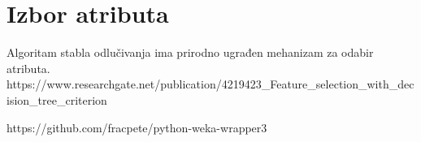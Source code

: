 \section{Izbor atributa}
\label{ch:ch3}

Algoritam stabla odlučivanja ima prirodno ugrađen mehanizam za odabir atributa. 
https://www.researchgate.net/publication/4219423_Feature_selection_with_decision_tree_criterion

https://github.com/fracpete/python-weka-wrapper3

